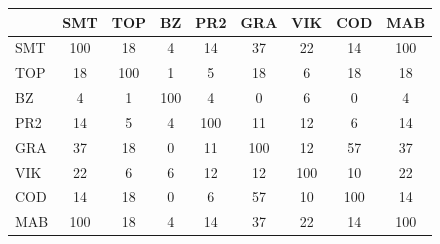 \begin{tabular}{lcccccccc}
\hline
 & SMT & TOP & BZ & PR2 & GRA & VIK & COD & MAB \\
\hline
SMT & 100 & 18 & 4 & 14 & 37 & 22 & 14 & 100 \\
TOP & 18 & 100 & 1 & 5 & 18 & 6 & 18 & 18 \\
BZ & 4 & 1 & 100 & 4 & 0 & 6 & 0 & 4 \\
PR2 & 14 & 5 & 4 & 100 & 11 & 12 & 6 & 14 \\
GRA & 37 & 18 & 0 & 11 & 100 & 12 & 57 & 37 \\
VIK & 22 & 6 & 6 & 12 & 12 & 100 & 10 & 22 \\
COD & 14 & 18 & 0 & 6 & 57 & 10 & 100 & 14 \\
MAB & 100 & 18 & 4 & 14 & 37 & 22 & 14 & 100 \\
\hline
\end{tabular}